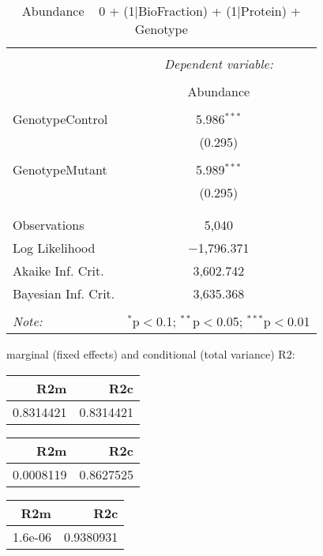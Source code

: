 \documentclass[11pt]{report}
\begin{document}
\begin{table}[!htbp] \centering 
  \caption{Abundance ~ 0 + (1|BioFraction) + (1|Protein) + Genotype} 
  \label{} 
\begin{tabular}{@{\extracolsep{5pt}}lc} 
\\[-1.8ex]\hline 
\hline \\[-1.8ex] 
 & \multicolumn{1}{c}{\textit{Dependent variable:}} \\ 
\cline{2-2} 
\\[-1.8ex] & Abundance \\ 
\hline \\[-1.8ex] 
 GenotypeControl & 5.986$^{***}$ \\ 
  & (0.295) \\ 
  & \\ 
 GenotypeMutant & 5.989$^{***}$ \\ 
  & (0.295) \\ 
  & \\ 
\hline \\[-1.8ex] 
Observations & 5,040 \\ 
Log Likelihood & $-$1,796.371 \\ 
Akaike Inf. Crit. & 3,602.742 \\ 
Bayesian Inf. Crit. & 3,635.368 \\ 
\hline 
\hline \\[-1.8ex] 
\textit{Note:}  & \multicolumn{1}{r}{$^{*}$p$<$0.1; $^{**}$p$<$0.05; $^{***}$p$<$0.01} \\ 
\end{tabular} 
\end{table} 
marginal (fixed effects) and conditional (total variance) R2:

\begin{tabular}{r|r}
\hline
R2m & R2c\\
\hline
0.8314421 & 0.8314421\\
\hline
\end{tabular}

\begin{tabular}{r|r}
\hline
R2m & R2c\\
\hline
0.0008119 & 0.8627525\\
\hline
\end{tabular}

\begin{tabular}{r|r}
\hline
R2m & R2c\\
\hline
1.6e-06 & 0.9380931\\
\hline
\end{tabular}
\end{document}
